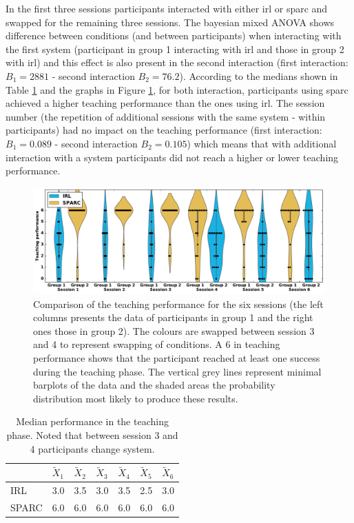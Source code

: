 In the first three sessions participants interacted with either \gls{irl} or \gls{sparc} and swapped for the remaining three sessions. The bayesian mixed ANOVA shows difference between conditions (and between participants) when interacting with the first system (participant in group 1 interacting with \gls{irl} and those in group 2 with \gls{irl}) and this effect is also present in the second interaction (first interaction:$B_1=2881$ - second interaction $B_2 = 76.2$). According to the medians shown in Table \ref{tab:control_teaching_perf} and the graphs in Figure \ref{fig:control_teaching_performance}, for both interaction, participants using \gls{sparc} achieved a higher teaching performance than the ones using \gls{irl}. The session number (the repetition of additional sessions with the same system - within participants) had no impact on the teaching performance (first interaction: $B_1=0.089$ - second interaction $B_2=0.105$) which means that with additional interaction with a system participants did not reach a higher or lower teaching performance.

\begin{figure}[ht]
	\includegraphics[width=\textwidth]{teaching_performance.pdf}
	\centering
	\caption{Comparison of the teaching performance for the six sessions (the left columns presents the data of participants in group 1 and the right ones those in group 2). The colours are swapped between session 3 and 4 to represent swapping of conditions. A 6 in teaching performance shows that the participant reached at least one success during the teaching phase. The vertical grey lines represent minimal barplots of the data and the shaded areas the probability distribution most likely to produce these results.
	}
	\label{fig:control_teaching_performance}
\end{figure}

\begin{table}[ht]
	\centering
	\caption{Median performance in the teaching phase. Noted that between session 3 and 4 participants change system.}
	\label{tab:control_teaching_perf}
	\begin{tabular}{@{}lllllll@{}}\toprule
		& $\widetilde{X}_{1}$ & $\widetilde{X}_{2}$ & $\widetilde{X}_{3}$ & $\widetilde{X}_{4}$ & $\widetilde{X}_{5}$ & $\widetilde{X}_{6}$\\ 
		\midrule
		IRL & 3.0 & 3.5 & 3.0 & 3.5 & 2.5 & 3.0\\
		SPARC & 6.0 & 6.0 & 6.0 & 6.0 & 6.0 & 6.0\\
		\bottomrule
	\end{tabular}
\end{table}

